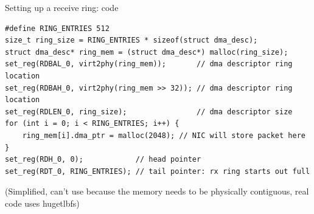 \documentclass[NET,english,aspectratio=169,notitleframe]{tumbeamer}
\begin{document}
\begin{frame}[fragile=singleslide]{Setting up a receive ring: code}
\begin{verbatim}
#define RING_ENTRIES 512
size_t ring_size = RING_ENTRIES * sizeof(struct dma_desc);
struct dma_desc* ring_mem = (struct dma_desc*) malloc(ring_size);
set_reg(RDBAL_0, virt2phy(ring_mem));       // dma descriptor ring location
set_reg(RDBAH_0, virt2phy(ring_mem >> 32)); // dma descriptor ring location
set_reg(RDLEN_0, ring_size);                // dma descriptor size
for (int i = 0; i < RING_ENTRIES; i++) {
	ring_mem[i].dma_ptr = malloc(2048); // NIC will store packet here
}
set_reg(RDH_0, 0);            // head pointer
set_reg(RDT_0, RING_ENTRIES); // tail pointer: rx ring starts out full
\end{verbatim}
\footnotesize{(Simplified, can't use  because the memory needs to be physically contiguous, real code uses hugetlbfs)}
\end{frame}



%

%

\end{document}
